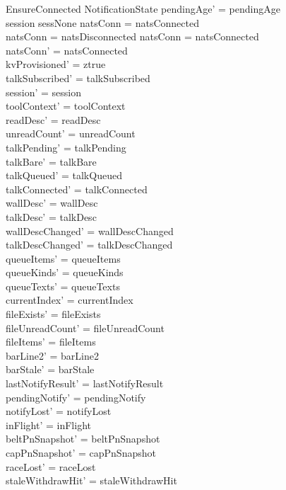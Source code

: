 \documentclass[a4paper,10pt,fleqn]{article}
\begin{document}
\begin{schema}{EnsureConnected}
  \Delta NotificationState
  \where
  pendingAge' = pendingAge \\
  session \neq sessNone \lor natsConn = natsConnected \\
  natsConn = natsDisconnected \lor natsConn = natsConnected \\
  natsConn' = natsConnected \\
  kvProvisioned' = ztrue \\
  talkSubscribed' = talkSubscribed \\
  session' = session \\
  toolContext' = toolContext \\
  readDesc' = readDesc \\
  unreadCount' = unreadCount \\
  talkPending' = talkPending \\
  talkBare' = talkBare \\
  talkQueued' = talkQueued \\
  talkConnected' = talkConnected \\
  wallDesc' = wallDesc \\
  talkDesc' = talkDesc \\
  wallDescChanged' = wallDescChanged \\
  talkDescChanged' = talkDescChanged \\
  queueItems' = queueItems \\
  queueKinds' = queueKinds \\
  queueTexts' = queueTexts \\
  currentIndex' = currentIndex \\
  fileExists' = fileExists \\
  fileUnreadCount' = fileUnreadCount \\
  fileItems' = fileItems \\
  barLine2' = barLine2 \\
  barStale' = barStale \\
  lastNotifyResult' = lastNotifyResult \\
  pendingNotify' = pendingNotify \\
  notifyLost' = notifyLost \\
  inFlight' = inFlight \\
  beltPnSnapshot' = beltPnSnapshot \\
  capPnSnapshot' = capPnSnapshot \\
  raceLost' = raceLost \\
  staleWithdrawHit' = staleWithdrawHit \\

\end{schema}
\end{document}
